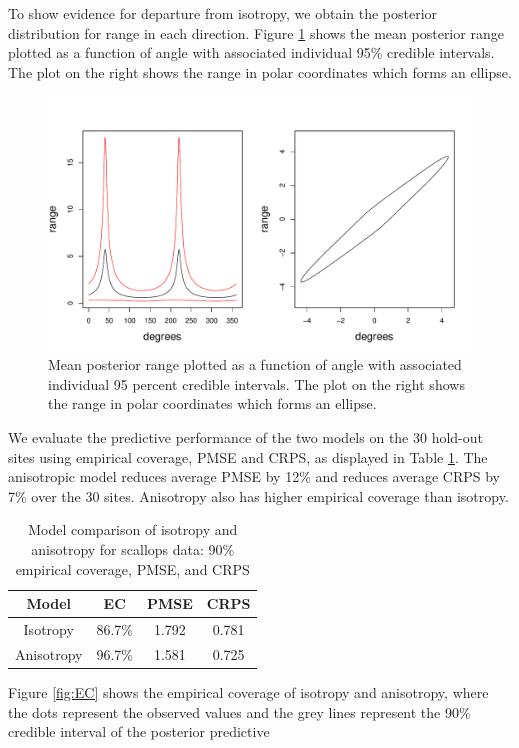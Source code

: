 \documentclass[12pt,twoside]{dukestatscithesis}
\theoremstyle{definition}
\theoremstyle{definition}
\theoremstyle{definition}
\theoremstyle{remark}
\begin{document}
To show evidence for departure from isotropy, we obtain the posterior
distribution for range in each direction. Figure \ref{fig:ranges} shows
the mean posterior range plotted as a function of angle with associated
individual 95\% credible intervals. The plot on the right shows the
range in polar coordinates which forms an ellipse.
\begin{figure}
\includegraphics[scale=0.6]{figure/ranges} \caption{Mean posterior range plotted as a function of angle with associated individual 95 percent credible intervals. The plot on the right shows the range in polar coordinates which forms an ellipse.}\label{fig:ranges}
\end{figure}
We evaluate the predictive performance of the two models on the 30
hold-out sites using empirical coverage, PMSE and CRPS, as displayed in
Table \ref{tab:eval}. The anisotropic model reduces average PMSE by 12\%
and reduces average CRPS by 7\% over the 30 sites. Anisotropy also has
higher empirical coverage than isotropy.
\begin{table}[H]
\centering
\setlength{\extrarowheight}{10pt}
\begin{tabular}{|c|c|c|c|}
\hline
Model & EC & PMSE & CRPS\\[10pt]
\hline
Isotropy & 86.7\% & 1.792 & 0.781\\
\hline
Anisotropy & 96.7\% & 1.581 & 0.725 \\
\hline
\end{tabular}
\caption{Model comparison of isotropy and anisotropy for scallops data: 90\% empirical coverage, PMSE, and CRPS}
\label{tab:eval}
\end{table}
Figure \ref{fig:EC} shows the empirical coverage of isotropy and
anisotropy, where the dots represent the observed values and the grey
lines represent the 90\% credible interval of the posterior predictive
\end{document}
